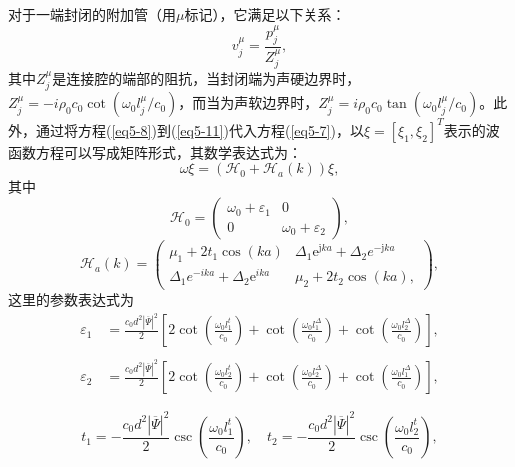 对于一端封闭的附加管（用$\mu$标记），它满足以下关系：
\begin{equation}\label{eq5-11}
    v_j^{\mu} = \frac{p_j^{\mu}}{Z_j^{\mu}},
\end{equation}
其中$Z_j^{\mu}$是连接腔的端部的阻抗，当封闭端为声硬边界时，$Z_j^{\mu} = -i\rho_0 c_0\cot(\omega_0 l_j^{\mu} / c_0)$，而当为声软边界时，$Z_j^{\mu} = i\rho_0 c_0\tan(\omega_0 l_j^{\mu} / c_0)$。此外，通过将方程(\ref{eq5-8})到(\ref{eq5-11})代入方程(\ref{eq5-7})，以$\xi = [\xi_1,\xi_2]^T$表示的波函数方程可以写成矩阵形式，其数学表达式为：
\begin{equation}\label{eq5-12}
    \omega \xi = (\mathcal{H}_0 + \mathcal{H}_a(k))\xi,
\end{equation}
其中
\begin{equation}\label{eq5-13}
    \mathcal{H}_0 = 
    \begin{pmatrix}
    \omega_0 + \varepsilon_1 & 0 \\
    0 & \omega_0 + \varepsilon_2
    \end{pmatrix},
\end{equation}
\begin{equation}\label{eq5-14}
    \mathcal{H}_a(k) =
    \begin{pmatrix}
        \mu_1 + 2t_1\cos(ka) & \Delta_1 \mathrm{e}^{\mathrm{j}ka} + \Delta_2 e^{-\mathrm{j}ka} \\
        \Delta_1 e^{-ika} + \Delta_2 \mathrm{e}^{ika} & \mu_2 + 2t_2\cos(ka),
    \end{pmatrix},
\end{equation}
这里的参数表达式为
\begin{equation}\label{eq5-15}
    \begin{split}
    \varepsilon_1 &= \frac{c_0d^2|\overline{\Psi}|^2}{2}\left[2\cot\left(\frac{\omega_0l_1^t}{c_0}\right) + \cot\left(\frac{\omega_0l_1^{\Delta}}{c_0}\right) + \cot\left(\frac{\omega_0l_2^{\Delta}}{c_0}\right)\right], \\ \quad \\
    \varepsilon_2 &= \frac{c_0d^2|\overline{\Psi}|^2}{2}\left[2\cot\left(\frac{\omega_0l_2^t}{c_0}\right) + \cot\left(\frac{\omega_0l_2^{\Delta}}{c_0}\right) + \cot\left(\frac{\omega_0l_1^{\Delta}}{c_0}\right)\right],
    \end{split}
\end{equation}
    
\begin{equation}\label{eq5-16}
    t_1 = -\frac{c_0d^2|\overline{\Psi}|^2}{2}\csc\left(\frac{\omega_0l_1^t}{c_0}\right), \quad t_2 = -\frac{c_0d^2|\overline{\Psi}|^2}{2}\csc\left(\frac{\omega_0l_2^t}{c_0}\right),
\end{equation}
    
